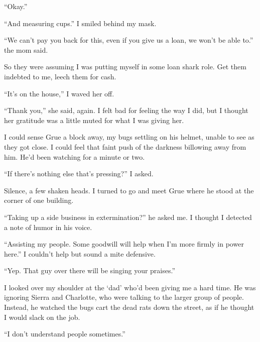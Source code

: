 ``Okay.''



``And measuring cups.''  I smiled behind my mask.



``We can't pay you back for this, even if you give us a loan, we won't be able to.'' the mom said.



So they were assuming I was putting myself in some loan shark role.  Get them indebted to me, leech them for cash.



``It's on the house,'' I waved her off.



``Thank you,'' she said, again.  I felt bad for feeling the way I did, but I thought her gratitude was a little muted for what I was giving her.



I could sense Grue a block away, my bugs settling on his helmet, unable to see as they got close.  I could feel that faint push of the darkness billowing away from him.  He'd been watching for a minute or two.



``If there's nothing else that's pressing?'' I asked.



Silence, a few shaken heads.  I turned to go and meet Grue where he stood at the corner of one building.



``Taking up a side business in extermination?'' he asked me.  I thought I detected a note of humor in his voice.



``Assisting my people.  Some goodwill will help when I'm more firmly in power here.''  I couldn't help but sound a mite defensive.



``Yep.  That guy over there will be singing your praises.''



I looked over my shoulder at the `dad' who'd been giving me a hard time.  He was ignoring Sierra and Charlotte, who were talking to the larger group of people.  Instead, he watched the bugs cart the dead rats down the street, as if he thought I would slack on the job.



``I don't understand people sometimes.''



